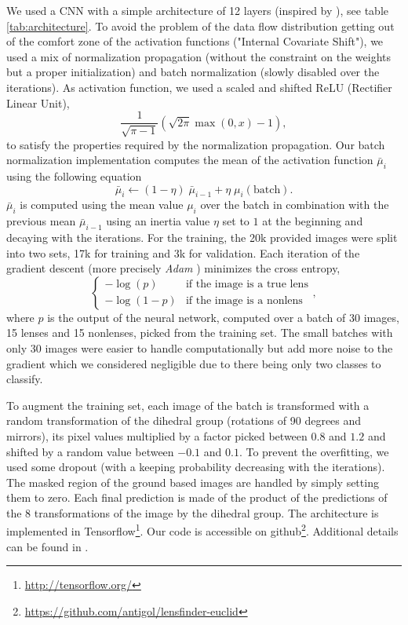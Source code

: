 \documentclass{aa}
\begin{document}
We used a CNN \citep{Fukushima1980,Lecun1998} with a simple architecture of 12 layers (inspired by \citep{symmetry}), see table \ref{tab:architecture}.
To avoid the problem of the data flow distribution getting out of the comfort zone of the activation functions ("Internal Covariate Shift"), we used a mix of normalization propagation \citep{norm_prop} (without the constraint on the weights but a proper initialization) and batch normalization \citep{batch_norm} (slowly disabled over the iterations).
As activation function, we used a scaled and shifted ReLU (Rectifier Linear Unit), 
\begin{equation} \label{eq:relu}
    \frac{1}{\sqrt{\pi-1}} (\sqrt{2 \pi} \max(0,x) - 1),
\end{equation}
to satisfy the properties required by the normalization propagation.
Our batch normalization implementation computes the mean of the activation function $\bar\mu_i$ using the following equation 
\begin{equation} \label{eq:batchnorm}
    \bar\mu_i \longleftarrow (1-\eta) \; \bar\mu_{i-1} + \eta \; \mu_i(\text{batch}).
\end{equation}
$\bar\mu_i$ is computed using the mean value $\mu_i$ over the batch in combination with the previous mean $\bar\mu_{i-1}$ using an inertia value $\eta$ set to $1$ at the beginning and decaying with the iterations.
For the training, the 20k provided images were split into two sets, 17k for training and 3k for validation.
Each iteration of the gradient descent (more precisely \textit{Adam} \citep{adam}) minimizes the cross entropy, 
\begin{equation} \label{eq:xent}
    \left\{
    \begin{array}{ll}
        - \log(p)   & \text{if the image is a true lens} \\
        - \log(1-p) & \text{if the image is a nonlens}
    \end{array}
    \right.,
\end{equation}
where $p$ is the output of the neural network, computed over a batch of 30 images, 15 lenses and 15 nonlenses, picked from the training set.
The small batches with only 30 images were easier to handle computationally but add more noise to the gradient which we considered negligible due to there being only two classes to classify.

To augment the training set, each image of the batch is transformed with a random transformation of the dihedral group (rotations of 90 degrees and mirrors), its pixel values multiplied by a factor picked between $0.8$ and $1.2$ and shifted by a random value between $-0.1$ and $0.1$.
To prevent the overfitting, we used some dropout \citep{dropout} (with a keeping probability decreasing with the iterations).
The masked region of the ground based images are handled by simply setting them to zero.
Each final prediction is made of the product of the predictions of the 8 transformations of the image by the dihedral group.
The architecture is implemented in Tensorflow\footnote{\url{http://tensorflow.org/}}.
Our code is accessible on github\footnote{\url{https://github.com/antigol/lensfinder-euclid}}. Additional details can be found in \citet{2017Schaefer}.
\end{document}
